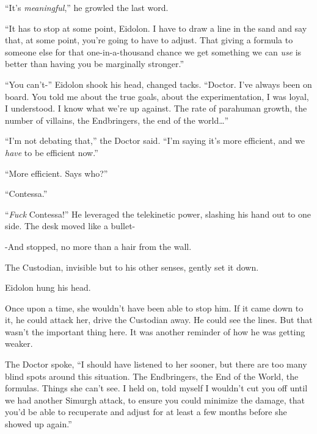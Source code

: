 ``It's \emph{meaningful},'' he growled the last word.



``It has to stop at some point, Eidolon.  I have to draw a line in the sand and say that, at some point, you're going to have to adjust.  That giving a formula to someone else for that one-in-a-thousand chance we get something we can \emph{use} is better than having you be marginally stronger.''



``You can't-'' Eidolon shook his head, changed tacks.  ``Doctor.  I've always been on board.  You told me about the true goals, about the experimentation, I was loyal, I understood.   I know what we're up against.  The rate of parahuman growth, the number of villains, the Endbringers, the end of the world\ldots''



``I'm not debating that,'' the Doctor said.  ``I'm saying it's more efficient, and we \emph{have} to be efficient now.''



``More efficient.  Says who?''



``Contessa.''



``\emph{Fuck} Contessa!''  He leveraged the telekinetic power, slashing his hand out to one side. The desk moved like a bullet-



-And stopped, no more than a hair from the wall.



The Custodian, invisible but to his other senses, gently set it down.



Eidolon hung his head.



Once upon a time, she wouldn't have been able to stop him.  If it came down to it, he could attack her, drive the Custodian away.  He could see the lines.  But that wasn't the important thing here.  It was another reminder of how he was getting weaker.



The Doctor spoke, ``I should have listened to her sooner, but there are too many blind spots around this situation.  The Endbringers, the End of the World, the formulas.  Things she can't see.  I held on, told myself I wouldn't cut you off until we had another Simurgh attack, to ensure you could minimize the damage, that you'd be able to recuperate and adjust for at least a few months before she showed up again.''



